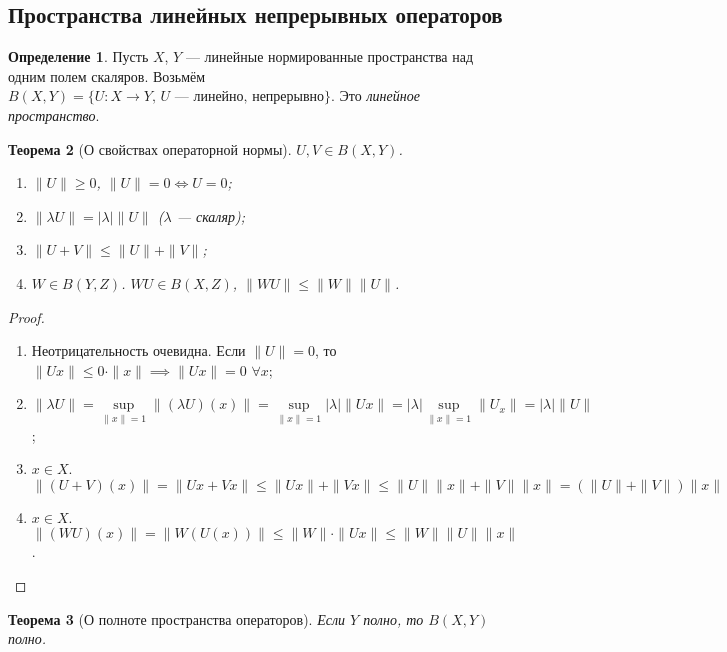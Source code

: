 \documentclass[11pt,openany,a4paper]{scrartcl}
\theoremstyle{plain}
\newtheorem{theorem}{Теорема}[subsection]
\theoremstyle{definition}
\newtheorem{definition}[theorem]{Определение}
\begin{document}
\subsection{Пространства линейных непрерывных операторов}
\begin{definition}
    Пусть $X$, $Y$ — линейные нормированные пространства над одним полем скаляров. Возьмём
    $B(X,Y) = \{U: X \to Y,\, U \text{ — линейно, непрерывно}\}$.
    Это \emph{линейное пространство}.
\end{definition}
\begin{theorem}[О свойствах операторной нормы]
    $U,V \in B(X, Y)$.
    \begin{enumerate}
        \item $\|U\| \geqslant 0$, $\|U\| = 0 \iff U = 0$;
        \item $\|\lambda U\| = |\lambda|\|U\|$ ($\lambda$ — скаляр);
        \item $\|U + V\| \leqslant \|U\| + \|V\|$;
        \item $W \in B(Y,Z)$. $WU \in B(X, Z)$, $\|WU\| \leqslant \|W\|\|U\|$.
    \end{enumerate}
\end{theorem}
\begin{proof}
\mbox{}
    \begin{enumerate}
        \item Неотрицательность очевидна. Если $\|U\|=0$, то $\|Ux\|\leqslant
        0\cdot \|x\| \implies \|Ux\| = 0$ $\forall x$;
        \item $\|\lambda U\| = \sup\limits_{\|x\|=1} \|(\lambda U)(x)\| =
         \sup\limits_{\|x\|=1} |\lambda|\|Ux\| = |\lambda| \sup\limits_{\|x\|=1}
         \|U_x\| =
         |\lambda|\|U\|$;
         \item $x \in X$. $\|(U+V)(x)\| = \|Ux + Vx\| \leqslant \|Ux\| + \|Vx\|
         \leqslant \|U\|\|x\| + \|V\|\|x\| = (\|U\| + \|V\|)\|x\|$
         \item $x \in X$. $\|(WU)(x)\| = \|W(U(x))\| \leqslant \|W\|\cdot \|Ux\|
         \leqslant \|W\|\|U\|\|x\|$.
    \end{enumerate}
\end{proof}
\begin{theorem}[О полноте пространства операторов]
    Если $Y$ полно, то $B(X, Y)$ полно.
\end{theorem}
\end{document}
